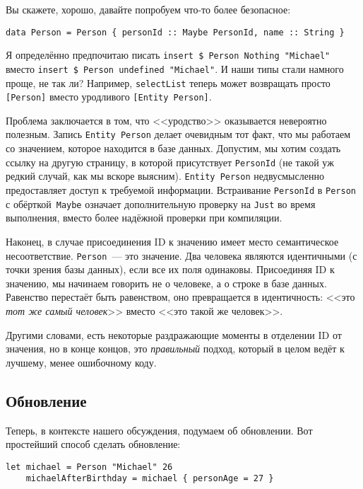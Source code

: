 Вы скажете, хорошо, давайте попробуем что-то более безопасное:

\begin{lstlisting}
data Person = Person { personId :: Maybe PersonId, name :: String }
\end{lstlisting}

Я определённо предпочитаю писать \lstinline'insert $ Person Nothing "Michael"'
вместо \lstinline'insert $ Person undefined "Michael"'.
И наши типы стали
намного проще, не так ли? Например, \lstinline'selectList' теперь может
возвращать просто \lstinline'[Person]' вместо уродливого \lstinline'[Entity Person]'.

Проблема заключается в том, что <<уродство>> оказывается невероятно полезным.
Запись \lstinline'Entity Person' делает очевидным тот факт, что мы работаем со
значением, которое находится в базе данных. Допустим, мы хотим создать ссылку
на другую страницу, в которой присутствует \lstinline'PersonId' (не такой уж
редкий случай, как мы вскоре выясним). \lstinline'Entity Person' недвусмысленно
предоставляет доступ к требуемой информации. Встраивание \lstinline'PersonId' в
\lstinline'Person' с обёрткой~\lstinline'Maybe' означает дополнительную
проверку на \lstinline'Just' во время выполнения, вместо более надёжной
проверки при компиляции.

Наконец, в случае присоединения ID к значению имеет место семантическое
несоответствие. \lstinline'Person'~--- это значение. Два человека являются идентичными (с
точки зрения базы данных), если все их поля одинаковы. Присоединяя ID к
значению, мы начинаем говорить не о человеке, а о строке в базе данных.
Равенство перестаёт быть равенством, оно превращается в идентичность: <<это
\emph{тот же самый человек}>> вместо <<это такой же человек>>.

Другими словами, есть некоторые раздражающие моменты в отделении ID от
значения, но в конце концов, это \emph{правильный} подход, который в целом
ведёт к лучшему, менее ошибочному коду.

\subsection{Обновление}

Теперь, в контексте нашего обсуждения, подумаем об обновлении. Вот простейший
способ сделать обновление:

\begin{lstlisting}
let michael = Person "Michael" 26
    michaelAfterBirthday = michael { personAge = 27 }
\end{lstlisting}

